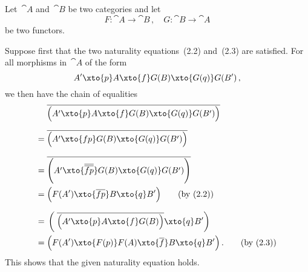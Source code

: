 \subsection{}

Let~$\cat{A}$ and~$\cat{B}$ be two categories and let
\[
	F \colon \cat{A} \to \cat{B} \,,
	\quad
	G \colon \cat{B} \to \cat{A}
\]
be two functors.

Suppose first that the two naturality equations~(2.2) and~(2.3) are satisfied.
For all morphisms in~$\cat{A}$ of the form
\[
	A'
	\xto{p}
	A
	\xto{f}
	G(B)
	\xto{G(q)}
	G(B') \,,
\]
we then have the chain of equalities
\begingroup
\allowdisplaybreaks
\begin{align*}
	{}&
	\adjtranspose{
		\Bigl(
			A'
			\xto{p}
			A
			\xto{f}
			G(B)
			\xto{G(q)}
			G(B')
		\Bigr)
	}
	\\[0.6em]
	={}&
	\adjtranspose{
		\Bigl(
			A'
			\xto{f p}
			G(B)
			\xto{G(q)}
			G(B')
		\Bigr)
	}
	\\[0.7em]
	={}&
	\adjtranspose{
		\Biggl(
			A'
			\xto{\adjtranspose{\adjtranspose{f p}}}
			G(B)
			\xto{G(q)}
			G(B')
		\Biggr)
	}
	\\
	={}&
	\Bigl(
		F(A')
		\xto{\adjtranspose{f p}}
		B
		\xto{q}
		B'
	\Bigr)
	\tag{by~(2.2)}
	\\[0.7em]
	={}&
	\left(
		\;
		\adjtranspose{
			\Bigl(
				A'
				\xto{p}
				A
				\xto{f}
				G(B)
			\Bigr)
		}
		\xto{q}
		B'
	\right)
	\\
	={}&
	\Bigl(
		F(A')
		\xto{F(p)}
		F(A)
		\xto{\adjtranspose{f}}
		B
		\xto{q}
		B'
	\Bigr) \,.
	\tag{by~(2.3)}
\end{align*}
\endgroup
This shows that the given naturality equation holds.

